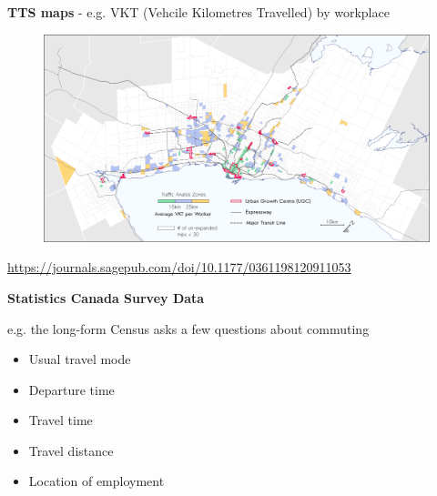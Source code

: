 \documentclass[aspectratio=169]{beamer}
\begin{document}
\begin{frame}
	
	\textbf{TTS maps} - e.g. VKT (Vehcile Kilometres Travelled) by workplace
	
	\begin{figure}
		\centering
		\includegraphics[width=1\linewidth]{images/vkt_map_7.png}
	\end{figure}

	\tiny\url{https://journals.sagepub.com/doi/10.1177/0361198120911053}
	
\end{frame}



\begin{frame}
	
	\textbf{Statistics Canada Survey Data}
	
	\vspace{2mm}
	
	e.g. the long-form Census asks a few questions about commuting
	
	\begin{itemize}
		\item Usual travel mode
		\item Departure time
		\item Travel time
		\item Travel distance
		\item Location of employment
	\end{itemize}
	
\end{frame}
\end{document}
